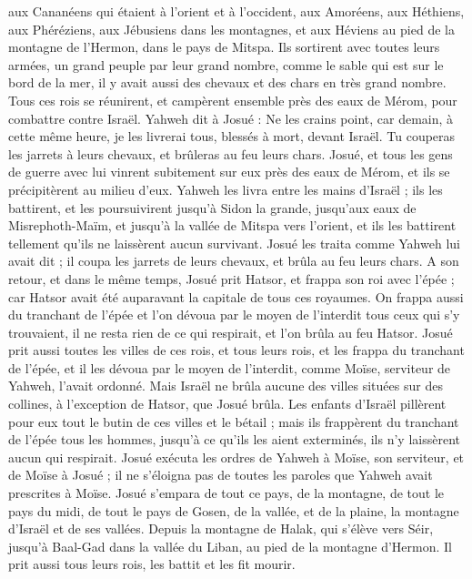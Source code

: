 \begin{multicols}{2}
aux Cananéens qui étaient à l’orient et à l’occident, aux Amoréens, aux Héthiens, aux Phéréziens, aux Jébusiens dans les montagnes, et aux Héviens au pied de la montagne de l’Hermon, dans le pays de Mitspa.
Ils sortirent avec toutes leurs armées, un grand peuple par leur grand nombre, comme le sable qui est sur le bord de la mer, il y avait aussi des chevaux et des chars en très grand nombre.
Tous ces rois se réunirent, et campèrent ensemble près des eaux de Mérom, pour combattre contre Israël.
Yahweh dit à Josué : Ne les crains point, car demain, à cette même heure, je les livrerai tous, blessés à mort, devant Israël. Tu couperas les jarrets à leurs chevaux, et brûleras au feu leurs chars.
Josué, et tous les gens de guerre avec lui vinrent subitement sur eux près des eaux de Mérom, et ils se précipitèrent au milieu d’eux.
Yahweh les livra entre les mains d’Israël ; ils les battirent, et les poursuivirent jusqu’à Sidon la grande, jusqu’aux eaux de Misrephoth-Maïm, et jusqu’à la vallée de Mitspa vers l’orient, et ils les battirent tellement qu’ils ne laissèrent aucun survivant.
Josué les traita comme Yahweh lui avait dit ; il coupa les jarrets de leurs chevaux, et brûla au feu leurs chars.
A son retour, et dans le même temps, Josué prit Hatsor, et frappa son roi avec l’épée ; car Hatsor avait été auparavant la capitale de tous ces royaumes.
On frappa aussi du tranchant de l’épée et l’on dévoua par le moyen de l'interdit tous ceux qui s’y trouvaient, il ne resta rien de ce qui respirait, et l’on brûla au feu Hatsor.
Josué prit aussi toutes les villes de ces rois, et tous leurs rois, et les frappa du tranchant de l’épée, et il les dévoua par le moyen de l'interdit, comme Moïse, serviteur de Yahweh, l’avait ordonné.
Mais Israël ne brûla aucune des villes situées sur des collines, à l’exception de Hatsor, que Josué brûla.
Les enfants d’Israël pillèrent pour eux tout le butin de ces villes et le bétail ; mais ils frappèrent du tranchant de l’épée tous les hommes, jusqu’à ce qu’ils les aient exterminés, ils n’y laissèrent aucun qui respirait.
Josué exécuta les ordres de Yahweh à Moïse, son serviteur, et de Moïse à Josué ; il ne s’éloigna pas de toutes les paroles que Yahweh avait prescrites à Moïse.
Josué s’empara de tout ce pays, de la montagne, de tout le pays du midi, de tout le pays de Gosen, de la vallée, et de la plaine, la montagne d’Israël et de ses vallées.
Depuis la montagne de Halak, qui s’élève vers Séir, jusqu’à Baal-Gad dans la vallée du Liban, au pied de la montagne d’Hermon. Il prit aussi tous leurs rois, les battit et les fit mourir.

\end{multicols}
